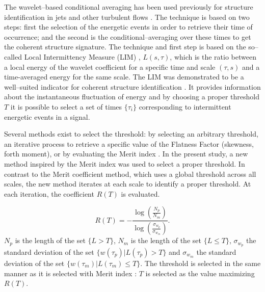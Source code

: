 The wavelet--based conditional averaging has been used previously for structure identification in jets and other turbulent flows \citep{Camussi1997,Camussi1999,Guj1999,Camussi2002,Guj2003}. The technique is based on two steps: first the selection of the energetic events in order to retrieve their time of occurrence; and the second is the conditional--averaging over these times to get the coherent structure signature.
The technique and first step is based on the so--called Local Intermittency Measure (LIM) \citep{Farge1992}, $L(s, \tau)$, which is the ratio between a local energy of the wavelet coefficient for a specific time and scale $(\tau, s)$ and a time-averaged energy for the same scale. The LIM was demonstrated to be a well--suited indicator for coherent structure identification \citep{Camussi1997}.  It provides information about the instantaneous fluctuation of energy and by choosing a proper threshold $T$ it is possible to select a set of times $\{\tau_{i}\}$ corresponding to intermittent energetic events in a signal.

Several methods exist to select the threshold: by selecting an arbitrary threshold, an iterative process to retrieve a specific value of the Flatness Factor (skewness, forth moment), or by evaluating the Merit index \citep{Grassucci2015}. 
In the present study, a new method inspired by the Merit index was used to select a proper threshold. 
In contrast to the Merit coefficient method, which uses a global threshold across all scales, the new method iterates at each scale to identify a proper threshold. At each iteration, the coefficient $R(T)$  is evaluated.

\begin{equation} \label{eqn:tEvaluation}
R(T) = -\frac{\log\left(\frac{N_p}{N_m}\right)}{\log\left(\frac{\sigma_{w_p}}{\sigma_{w_m}}\right)}.
\end{equation} 
$N_p$ is the length of the set $\{L > T\}$, $N_m$ is the length of the set $\{L \leqslant T\}$, $\sigma_{w_p}$ the standard deviation of the set $\{w\left( \tau_p\right) | L\left( \tau_p \right) > T\}$ and $\sigma_{w_m}$ the standard deviation of the set $\{w\left( \tau_m\right) | L\left( \tau_m \right) \leqslant T\}$. The threshold is selected in the same manner as it is selected with Merit index \citep{Grassucci2015}: $T$ is selected as the value maximizing $R(T)$.

